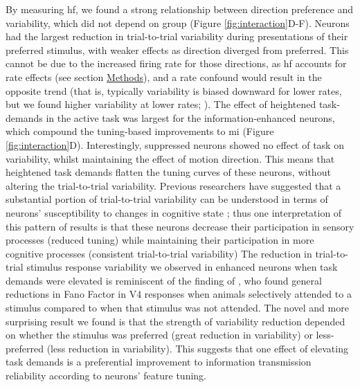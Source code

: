 By measuring \gls{hf}, we found a strong relationship between direction preference and variability, which did not depend on group (Figure \ref{fig:interaction}D-F). Neurons had the largest reduction in trial-to-trial variability during presentations of their preferred stimulus, with weaker effects as direction diverged from preferred. This cannot be due to the increased firing rate for those directions, as \gls{hf} accounts for rate effects (see section \hyperref[{sec:methods}]{Methods}), and a rate confound would result in the opposite trend (that is, typically variability is biased downward for lower rates, but we found higher variability at lower rates; \cite{Churchland2010}). The effect of heightened task-demands in the active task was largest for the information-enhanced neurons, which compound the tuning-based improvements to \gls{mi} (Figure \ref{fig:interaction}D). Interestingly, suppressed neurons showed no effect of task on variability, whilst maintaining the effect of motion direction. This means that heightened task demands flatten the tuning curves of these neurons, without altering the trial-to-trial variability.
Previous researchers have suggested that a substantial portion of trial-to-trial variability can be understood in terms of neurons' susceptibility to changes in cognitive state \parencite{Ecker2016a,Denfield2018a}; thus one interpretation of this pattern of results is that these neurons decrease their participation in sensory processes (reduced tuning) while maintaining their participation in more cognitive processes (consistent trial-to-trial variability)
The reduction in trial-to-trial stimulus response variability we observed in enhanced neurons when task demands were elevated is reminiscent of the finding of \textcite{Mitchell2007}, who found general reductions in Fano Factor in V4 responses when animals selectively attended to a stimulus compared to when that stimulus was not attended.
The novel and more surprising result we found is that the strength of variability reduction depended on whether the stimulus was preferred (great reduction in variability) or less-preferred (less reduction in variability). This suggests that one effect of elevating task demands is a preferential improvement to information transmission reliability according to neurons' feature tuning.

